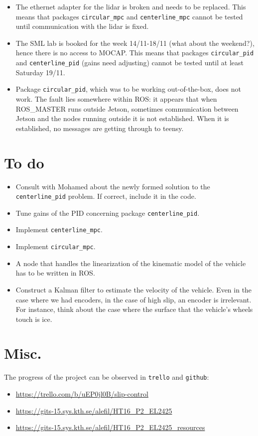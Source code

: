 \documentclass[oneside,12pt]{article}
\begin{document}
\begin{itemize}
  \item The ethernet adapter for the lidar is broken and needs to be replaced.
    This means that packages \texttt{circular\_mpc} and \texttt{centerline\_mpc}
    cannot be tested until communication with the lidar is fixed.
  \item The SML lab is booked for the week 14/11-18/11 (what about the weekend?),
    hence there is no access to MOCAP. This means that packages
    \texttt{circular\_pid} and \texttt{centerline\_pid} (gains need adjusting)
    cannot be tested until at least Saturday 19/11.
  \item Package \texttt{circular\_pid}, which was to be working out-of-the-box,
    does not work. The fault lies somewhere within ROS: it appears that when
    ROS\_MASTER runs outside Jetson, sometimes communication between Jetson and the
    nodes running outside it is not established. When it is established, no
    messages are getting through to teensy.
\end{itemize}


\section{To do}

\begin{itemize}
  \item Consult with Mohamed about the newly formed solution to the
    \texttt{centerline\_pid} problem. If correct, include it in the code.
  \item Tune gains of the PID concerning package \texttt{centerline\_pid}.
  \item Implement \texttt{centerline\_mpc}.
  \item Implement \texttt{circular\_mpc}.
  \item A node that handles the linearization of the kinematic model of the
    vehicle has to be written in ROS.
  \item Construct a Kalman filter to estimate the velocity of the vehicle.
    Even in the case where we had encoders, in the case of high slip, an
    encoder is irrelevant. For instance, think about the case where the
    surface that the vehicle's wheels touch is ice.
\end{itemize}

\section{Misc.}

The progress of the project can be observed in \texttt{trello} and \texttt{github}:

\begin{itemize}
  \item \url{https://trello.com/b/uEP0jl0B/slip-control}
  \item \url{https://gits-15.sys.kth.se/alefil/HT16_P2_EL2425}
  \item \url{https://gits-15.sys.kth.se/alefil/HT16_P2_EL2425_resources}
\end{itemize}
\end{document}
